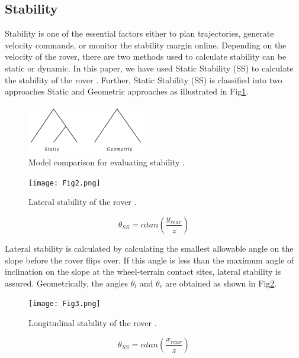 \documentclass[default,iicol]{sn-jnl}
\theoremstyle{thmstyleone}
\theoremstyle{thmstyletwo}
\theoremstyle{thmstylethree}
\begin{document}
\subsection{Stability}\label{subsec1}

Stability is one of the essential factors either to plan trajectories, generate velocity commands, or monitor the stability margin online. Depending on the velocity of the rover, there are two methods used to calculate stability can be static or dynamic. In this paper, we have used Static Stability (SS) to calculate the stability of the rover \cite{bib5}. Further, Static Stability (SS) is classified into two approaches Static and Geometric approaches as illustrated in Fig\ref{fig1}.  

\begin{figure}[ht]
\centering
\includegraphics[width=0.46\textwidth]{Fig1.png}
\caption{Model comparison for evaluating stability \cite{bib5}.}\label{fig1}
\end{figure}

\begin{figure}[ht]
\centering
\texttt{[image: Fig2.png]}
\caption{Lateral stability of the rover \cite{bib5}.}\label{fig2}
\end{figure}

\begin{equation}
\theta_{SS}=\alpha tan\left ( \frac{y_{rear}}{z}\right)
\end{equation}

Lateral stability is calculated by calculating the smallest allowable angle on the slope before the rover flips over. If this angle is less than the maximum angle of inclination on the slope at the wheel-terrain contact sites, lateral stability is assured. Geometrically, the angles $\theta_{l}$ and $\theta_{r}$ are obtained as shown in Fig\ref{fig2}.

\begin{figure}[ht]
\centering
\texttt{[image: Fig3.png]}
\caption{Longitudinal stability of the rover \cite{bib5}.}\label{fig3}
\end{figure}

\begin{equation}
\theta_{SS}=\alpha tan\left ( \frac{x_{rear}}{z}\right)
\end{equation}
\end{document}
